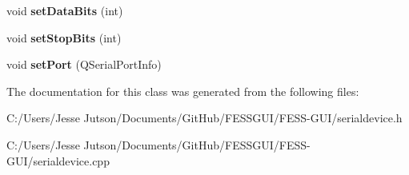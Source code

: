 \begin{DoxyCompactItemize}
\item 
\hypertarget{class_serial_device_ad0ddca3e77e1d1d4df7c68e83f1ecd91}{}\label{class_serial_device_ad0ddca3e77e1d1d4df7c68e83f1ecd91} 
void {\bfseries set\+Data\+Bits} (int)
\item 
\hypertarget{class_serial_device_a95b44d8167ae0a6a025ba9c4f2d5ee47}{}\label{class_serial_device_a95b44d8167ae0a6a025ba9c4f2d5ee47} 
void {\bfseries set\+Stop\+Bits} (int)
\item 
\hypertarget{class_serial_device_a1440b389cc1bba66e9854a32a5807a8f}{}\label{class_serial_device_a1440b389cc1bba66e9854a32a5807a8f} 
void {\bfseries set\+Port} (Q\+Serial\+Port\+Info)
\end{DoxyCompactItemize}


The documentation for this class was generated from the following files\+:\begin{DoxyCompactItemize}
\item 
C\+:/\+Users/\+Jesse Jutson/\+Documents/\+Git\+Hub/\+F\+E\+S\+S\+G\+U\+I/\+F\+E\+S\+S-\/\+G\+U\+I/serialdevice.\+h\item 
C\+:/\+Users/\+Jesse Jutson/\+Documents/\+Git\+Hub/\+F\+E\+S\+S\+G\+U\+I/\+F\+E\+S\+S-\/\+G\+U\+I/serialdevice.\+cpp\end{DoxyCompactItemize}
